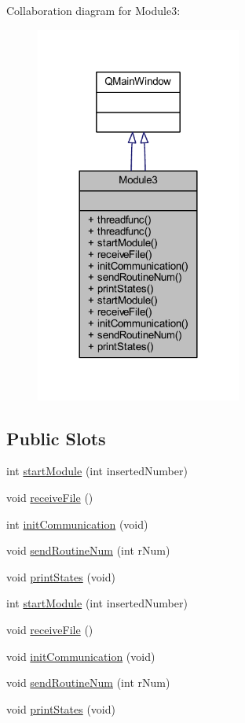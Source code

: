 Collaboration diagram for Module3\+:
\nopagebreak
\begin{figure}[H]
\begin{center}
\leavevmode
\includegraphics[width=192pt]{class_module3__coll__graph}
\end{center}
\end{figure}
\subsection*{Public Slots}
\begin{DoxyCompactItemize}
\item 
int \mbox{\hyperlink{class_module3_af03e3df56d29af941005a6c83717d8db}{start\+Module}} (int inserted\+Number)
\item 
void \mbox{\hyperlink{class_module3_a81f76e7a449ea3a014a862ec7d33498a}{receive\+File}} ()
\item 
int \mbox{\hyperlink{class_module3_ac66437d00aebddd32dc0618de74ea5a3}{init\+Communication}} (void)
\item 
void \mbox{\hyperlink{class_module3_a17b4aac26b4f9d44ec48a8022913cc7a}{send\+Routine\+Num}} (int r\+Num)
\item 
void \mbox{\hyperlink{class_module3_ac91b756cb9b50b0d7e2e177823baad48}{print\+States}} (void)
\item 
int \mbox{\hyperlink{class_module3_af03e3df56d29af941005a6c83717d8db}{start\+Module}} (int inserted\+Number)
\item 
void \mbox{\hyperlink{class_module3_a81f76e7a449ea3a014a862ec7d33498a}{receive\+File}} ()
\item 
void \mbox{\hyperlink{class_module3_ac66437d00aebddd32dc0618de74ea5a3}{init\+Communication}} (void)
\item 
void \mbox{\hyperlink{class_module3_a17b4aac26b4f9d44ec48a8022913cc7a}{send\+Routine\+Num}} (int r\+Num)
\item 
void \mbox{\hyperlink{class_module3_ac91b756cb9b50b0d7e2e177823baad48}{print\+States}} (void)
\end{DoxyCompactItemize}
